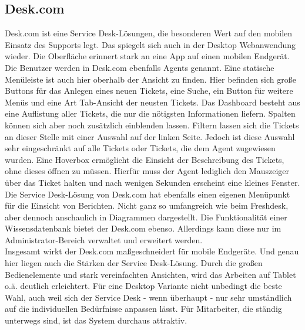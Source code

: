 \subsection{Desk.com}
\noindent
Desk.com ist eine Service Desk-Lösungen, die besonderen Wert auf den mobilen Einsatz des Supports legt. Das spiegelt sich auch in der Desktop Webanwendung wieder. Die Oberfläche erinnert stark an eine App auf einen mobilen Endgerät. Die Benutzer werden in Desk.com ebenfalls Agents genannt. 
Eine statische Menüleiste ist auch hier oberhalb der Ansicht zu finden. Hier befinden sich große Buttons für das Anlegen eines neuen Tickets, eine Suche, ein Button für weitere Menüs und eine Art Tab-Ansicht der neusten Tickets. Das Dashboard besteht aus eine Auflistung aller Tickets, die nur die nötigsten Informationen liefern. Spalten können sich aber noch zusätzlich einblenden lassen. Filtern lassen sich die Tickets an dieser Stelle mit einer Auswahl auf der linken Seite. Jedoch ist diese Auswahl sehr eingeschränkt auf alle Tickets oder Tickets, die dem Agent zugewiesen wurden. Eine Hoverbox ermöglicht die Einsicht der Beschreibung des Tickets, ohne dieses öffnen zu müssen. Hierfür muss der Agent lediglich den Mauszeiger über das Ticket halten und nach wenigen Sekunden erscheint eine kleines Fenster. Die Service Desk-Lösung von Desk.com hat ebenfalls einen eigenen Menüpunkt für die Einsicht von Berichten. Nicht ganz so umfangreich wie beim Freshdesk, aber dennoch anschaulich in Diagrammen dargestellt. Die Funktionalität einer Wissensdatenbank bietet der Desk.com ebenso. Allerdings kann diese nur im Administrator-Bereich verwaltet und erweitert werden.\\
Insgesamt wirkt der Desk.com maßgeschneidert für mobile Endgeräte. Und genau hier liegen auch die Stärken der Service Desk-Lösung. Durch die großen Bedienelemente und stark vereinfachten Ansichten, wird das Arbeiten auf Tablet o.ä. deutlich erleichtert. Für eine Desktop Variante nicht unbedingt die beste Wahl, auch weil sich der Service Desk - wenn überhaupt - nur sehr umständlich auf die individuellen Bedürfnisse anpassen  lässt. Für Mitarbeiter, die ständig unterwegs sind, ist das System durchaus attraktiv.\\\\


